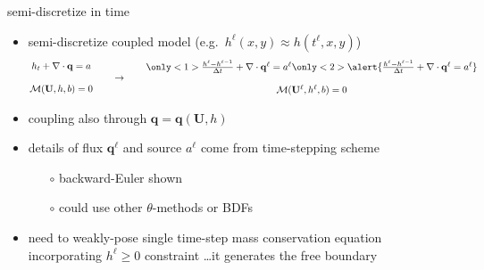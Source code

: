 \documentclass[xcolor={dvipsnames}]{beamer}
\newcommand\bq{\mathbf{q}}
\newcommand\bU{\mathbf{U}}
\newcommand\Div{\nabla\cdot}
\begin{document}
\newcommand{\singletsmc}{\frac{h^\ell - h^{\ell-1}}{\Delta t} + \Div \bq^\ell = a^\ell}
\begin{frame}{semi-discretize in time}

\begin{itemize}
\item semi-discretize coupled model (e.g.~$h^\ell(x,y) \approx h(t^\ell,x,y)$)
$$\begin{matrix}
 h_t + \Div\bq = a \\
 \phantom{foo} \\
 \mathcal{M}(\bU,h,b) = 0
\end{matrix} \qquad \to \qquad \begin{matrix}
 \only<1>{\singletsmc} \only<2>{\alert{\singletsmc}} \\
 \phantom{foo} \\
 \mathcal{M}(\bU^\ell,h^\ell,b) = 0
\end{matrix}$$
\item coupling also through $\bq=\bq(\bU,h)$
\item details of flux $\bq^\ell$ and source $a^\ell$ come from time-stepping scheme
        \begin{itemize}
        \item[$\circ$] backward-Euler shown
        \item[$\circ$] could use other $\theta$-methods or BDFs
        \end{itemize}
\item<2> \alert{need to weakly-pose single time-step mass conservation equation incorporating $h^\ell\ge 0$ constraint \dots it generates the free boundary}
\end{itemize}
\end{frame}
\end{document}
